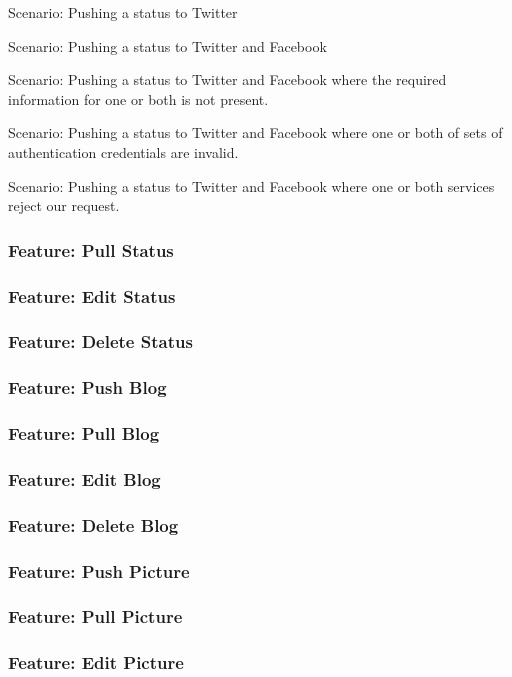 \documentclass[12pt]{article}
\begin{document}
Scenario: Pushing a status to Twitter

Scenario: Pushing a status to Twitter and Facebook

Scenario: Pushing a status to Twitter and Facebook where the required 
information for one or both is not present.

Scenario: Pushing a status to Twitter and Facebook where one or both of sets of 
authentication credentials are invalid.

Scenario: Pushing a status to Twitter and Facebook where one or both services 
reject our request.


\subsubsection{Feature: Pull Status}
\subsubsection{Feature: Edit Status}
\subsubsection{Feature: Delete Status}

\subsubsection{Feature: Push Blog}
\subsubsection{Feature: Pull Blog}
\subsubsection{Feature: Edit Blog}
\subsubsection{Feature: Delete Blog}

\subsubsection{Feature: Push Picture}
\subsubsection{Feature: Pull Picture}
\subsubsection{Feature: Edit Picture}
\end{document}
